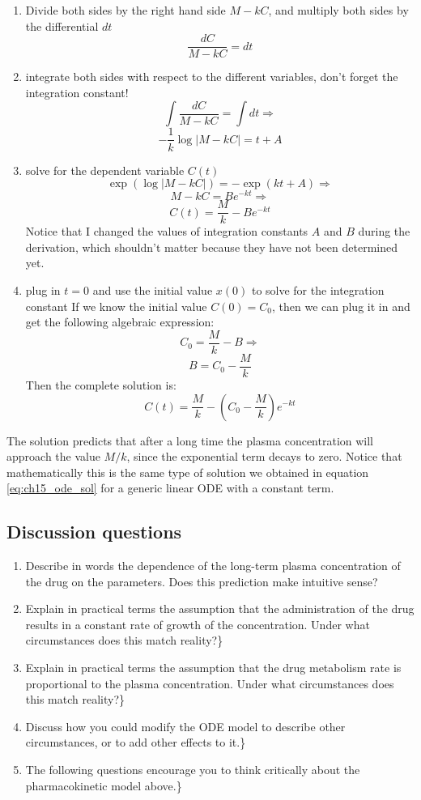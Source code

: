 \documentclass[
]{book}
\providecommand{\tightlist}{%
  \setlength{\itemsep}{0pt}\setlength{\parskip}{0pt}}
\theoremstyle{definition}
\theoremstyle{definition}
\theoremstyle{definition}
\theoremstyle{remark}
\begin{document}
\begin{enumerate}
\def\labelenumi{\arabic{enumi}.}
\tightlist
\item
  Divide both sides by the right hand side \(M-kC\), and multiply both sides by the differential \(dt\)
  \[ \frac{dC}{M-kC} = dt\]
\item
  integrate both sides with respect to the different variables, don't forget the integration constant!
  \[ \int \frac{dC}{M-kC} = \int dt \Rightarrow\]
  \[ -\frac{1}{k} \log |M-kC| = t + A\]
\item
  solve for the dependent variable \(C(t)\)
  \[ \exp(\log |M-kC| ) = -\exp(kt +A) \Rightarrow \]
  \[  M - kC = B e^{-kt} \Rightarrow \]
  \[ C(t) = \frac{M}{k}- Be^{-kt}\]
  Notice that I changed the values of integration constants \(A\) and \(B\) during the derivation, which shouldn't matter because they have not been determined yet.
\item
  plug in \(t=0\) and use the initial value \(x(0)\) to solve for the integration constant
  If we know the initial value \(C(0) = C_0\), then we can plug it in and get the following algebraic expression:
  \[ C_0 =  \frac{M}{k} - B \Rightarrow \]
  \[ B = C_0 -  \frac{M}{k}\]
  Then the complete solution is:
  \[ C(t) =  \frac{M}{k} - (C_0- \frac{M}{k})e^{-kt}\]
\end{enumerate}

The solution predicts that after a long time the plasma concentration will approach the value \(M/k\), since the exponential term decays to zero. Notice that mathematically this is the same type of solution we obtained in equation \ref{eq:ch15_ode_sol} for a generic linear ODE with a constant term.

\hypertarget{discussion-questions-2}{%
\subsection{Discussion questions}\label{discussion-questions-2}}

\begin{enumerate}
\def\labelenumi{\arabic{enumi}.}
\item
  Describe in words the dependence of the long-term plasma concentration of the drug on the parameters. Does this prediction make intuitive sense?
\item
  Explain in practical terms the assumption that the administration of the drug results in a constant rate of growth of the concentration. Under what circumstances does this match reality?\}
\item
  Explain in practical terms the assumption that the drug metabolism rate is proportional to the plasma concentration. Under what circumstances does this match reality?\}
\item
  Discuss how you could modify the ODE model to describe other circumstances, or to add other effects to it.\}
\item
  The following questions encourage you to think critically about the pharmacokinetic model above.\}
\end{enumerate}
\end{document}
